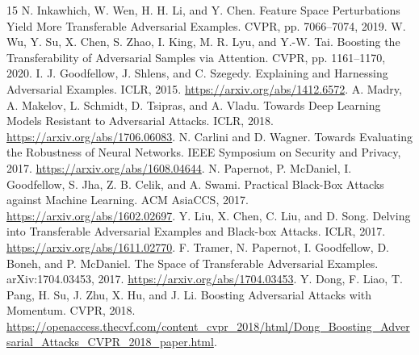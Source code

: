 \documentclass[10pt,twocolumn]{article}
\begin{document}
\begin{table}[!htbp]
\centering
\caption{FGSM PTR (\%) at $8/255$, mean [minimum, maximum] over three seeds.}
\label{tab:fgsm}
\end{table}

\clearpage
\begin{thebibliography}{15}
 N. Inkawhich, W. Wen, H. H. Li, and Y. Chen. Feature Space Perturbations Yield More Transferable Adversarial Examples. CVPR, pp. 7066--7074, 2019.
 W. Wu, Y. Su, X. Chen, S. Zhao, I. King, M. R. Lyu, and Y.-W. Tai. Boosting the Transferability of Adversarial Samples via Attention. CVPR, pp. 1161--1170, 2020.
 I. J. Goodfellow, J. Shlens, and C. Szegedy. Explaining and Harnessing Adversarial Examples. ICLR, 2015. \url{https://arxiv.org/abs/1412.6572}.
 A. Madry, A. Makelov, L. Schmidt, D. Tsipras, and A. Vladu. Towards Deep Learning Models Resistant to Adversarial Attacks. ICLR, 2018. \url{https://arxiv.org/abs/1706.06083}.
 N. Carlini and D. Wagner. Towards Evaluating the Robustness of Neural Networks. IEEE Symposium on Security and Privacy, 2017. \url{https://arxiv.org/abs/1608.04644}.
 N. Papernot, P. McDaniel, I. Goodfellow, S. Jha, Z. B. Celik, and A. Swami. Practical Black-Box Attacks against Machine Learning. ACM AsiaCCS, 2017. \url{https://arxiv.org/abs/1602.02697}.
 Y. Liu, X. Chen, C. Liu, and D. Song. Delving into Transferable Adversarial Examples and Black-box Attacks. ICLR, 2017. \url{https://arxiv.org/abs/1611.02770}.
 F. Tramer, N. Papernot, I. Goodfellow, D. Boneh, and P. McDaniel. The Space of Transferable Adversarial Examples. arXiv:1704.03453, 2017. \url{https://arxiv.org/abs/1704.03453}.
 Y. Dong, F. Liao, T. Pang, H. Su, J. Zhu, X. Hu, and J. Li. Boosting Adversarial Attacks with Momentum. CVPR, 2018. \url{https://openaccess.thecvf.com/content_cvpr_2018/html/Dong_Boosting_Adversarial_Attacks_CVPR_2018_paper.html}.

\end{thebibliography}
\end{document}
